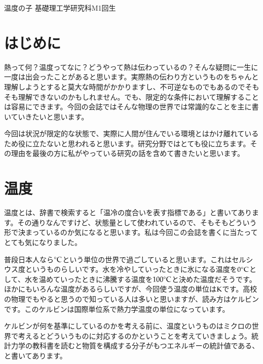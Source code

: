 \documentclass[10pt,b5paper,papersize,dvipdfmx]{jsbook}
\begin{document}


\kaishititle%
  {温度の子}%
  {基礎理工学研究科M1回生}%
  {}%


\section*{はじめに}
熱って何？温度ってなに？どうやって熱は伝わっているの？そんな疑問に一生に一度は出会ったことがあると思います。実際熱の伝わり方というものをちゃんと理解しようとすると莫大な時間がかかりますし、不可逆なものでもあるのでそもそも理解できないのかもしれません。でも、限定的な条件において理解することは容易にできます。今回の会誌ではそんな物理の世界では常識的なことを主に書いていきたいと思います。\par
今回は状況が限定的な状態で、実際に人間が住んでいる環境とはかけ離れているため役に立たないと思われると思います。研究分野ではとても役に立ちます。その理由を最後の方に私がやっている研究の話を含めて書きたいと思います。


%
\section{温度}
温度とは、辞書で検索すると「温冷の度合いを表す指標である」と書いてあります。その通りなんですけど、状態量として使われているので、そもそもどういう形で決まっているのか気になると思います。私は今回この会誌を書くに当たってとても気になりました。\par 
普段日本人なら$^\circ \rm{C}$という単位の世界で過ごしていると思います。これはセルシウス度というものらしいです。水を冷やしていったときに氷になる温度を$0 ^\circ \rm{C}$として、水を温めていったときに沸騰する温度を$100 ^\circ \rm{C}$と決めた温度だそうです。ほかにもいろんな温度があるらしいですが、今回使う温度の単位は$\rm{K}$です。高校の物理でもやると思うので知っている人は多いと思いますが、読み方はケルビンです。このケルビンは国際単位系で熱力学温度の単位になっています。\par





ケルビンが何を基準にしているのかを考える前に、温度というものはミクロの世界で考えるとどういうものに対応するのかということを考えていきましょう。統計力学の教科書を読むと物質を構成する分子がもつエネルギーの統計値である、と書いてあります。\par
\end{document}
